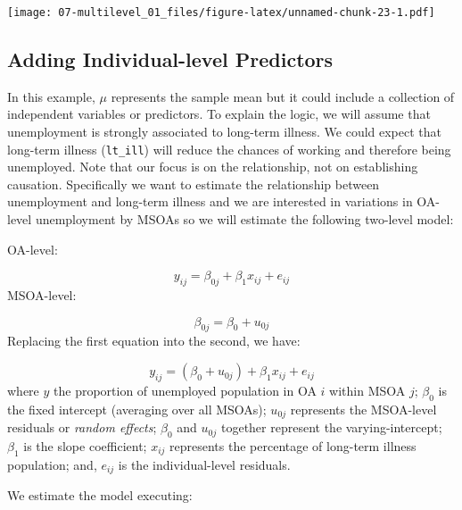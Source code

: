 \documentclass[
]{book}
\newenvironment{Shaded}{\begin{snugshade}}{\end{snugshade}}
\newcommand{\AttributeTok}[1]{\textcolor[rgb]{0.77,0.63,0.00}{#1}}
\newcommand{\CommentTok}[1]{\textcolor[rgb]{0.56,0.35,0.01}{\textit{#1}}}
\newcommand{\DecValTok}[1]{\textcolor[rgb]{0.00,0.00,0.81}{#1}}
\newcommand{\FunctionTok}[1]{\textcolor[rgb]{0.00,0.00,0.00}{#1}}
\newcommand{\NormalTok}[1]{#1}
\newcommand{\OtherTok}[1]{\textcolor[rgb]{0.56,0.35,0.01}{#1}}
\newcommand{\SpecialCharTok}[1]{\textcolor[rgb]{0.00,0.00,0.00}{#1}}
\begin{document}
\texttt{[image: 07-multilevel\_01\_files/figure-latex/unnamed-chunk-23-1.pdf]}

\hypertarget{adding-individual-level-predictors}{%
\subsection{Adding Individual-level Predictors}\label{adding-individual-level-predictors}}

In this example, \(\mu\) represents the sample mean but it could include a collection of independent variables or predictors. To explain the logic, we will assume that unemployment is strongly associated to long-term illness. We could expect that long-term illness (\texttt{lt\_ill}) will reduce the chances of working and therefore being unemployed. Note that our focus is on the relationship, not on establishing causation. Specifically we want to estimate the relationship between unemployment and long-term illness and we are interested in variations in OA-level unemployment by MSOAs so we will estimate the following two-level model:

OA-level:

\[y_{ij} = \beta_{0j} + \beta_{1}x_{ij} + e_{ij}\]
MSOA-level:

\[\beta_{0j} = \beta_{0} + u_{0j}\]
Replacing the first equation into the second, we have:

\[y_{ij} = (\beta_{0} + u_{0j}) + \beta_{1}x_{ij} + e_{ij}\]
where \(y\) the proportion of unemployed population in OA \(i\) within MSOA \(j\); \(\beta_{0}\) is the fixed intercept (averaging over all MSOAs); \(u_{0j}\) represents the MSOA-level residuals or \emph{random effects}; \(\beta_{0}\) and \(u_{0j}\) together represent the varying-intercept; \(\beta_{1}\) is the slope coefficient; \(x_{ij}\) represents the percentage of long-term illness population; and, \(e_{ij}\) is the individual-level residuals.

We estimate the model executing:

\begin{Shaded}
\end{Shaded}
\end{document}
